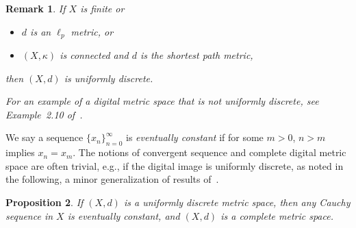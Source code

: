 \documentclass{article}
\newtheorem{thm}{Theorem}
\newtheorem{prop}[thm]{Proposition}
\newtheorem{remarks}[thm]{Remark}
\numberwithin{thm}{section}
\newcommand{\adj}{\leftrightarrow}
\begin{document}
\begin{remarks}
\label{unifDiscrete}
If $X$ is finite or  
\begin{itemize}
\item {\rm \cite{Bx19-3}}
$d$ is an $\ell_p$ metric, or
\item $(X,\kappa)$ is connected and $d$ is 
the shortest path metric,
\end{itemize}
then $(X,d)$ is uniformly discrete.

For an example of a digital metric space
that is not uniformly discrete, see
Example~2.10 of~{\rm \cite{Bx20}}.
\end{remarks}

We say a sequence $\{x_n\}_{n=0}^{\infty}$ is 
{\em eventually constant} if for some $m>0$, 
$n>m$ implies $x_n=x_m$.
The notions of convergent sequence and complete digital metric space are often trivial, 
e.g., if the digital image is uniformly 
discrete, as noted in the following, a minor 
generalization of results 
of~\cite{HanBan,BxSt19}.

\begin{prop}
\label{eventuallyConst}
{\rm \cite{Bx20}}
If $(X,d)$ is a uniformly discrete metric space,
then any Cauchy sequence in $X$
is eventually constant, and $(X,d)$ is a complete metric space.
\end{prop}

\end{document}
